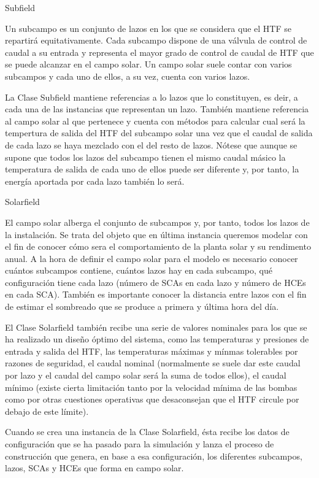 \documentclass[12pt]{report} %
\begin{document}
\hypertarget{subfield}{Subfield}

Un subcampo es un conjunto de lazos en los que se considera que el HTF se repartirá equitativamente. Cada subcampo dispone de una válvula de control de caudal a su entrada y representa el mayor grado de control de caudal de HTF que se puede alcanzar en el campo solar. Un campo solar suele contar con varios subcampos y cada uno de ellos, a su vez, cuenta con varios lazos.  

La Clase Subfield mantiene referencias a lo lazos que lo constituyen, es deir, a cada una de las instancias que representan un lazo. También mantiene referencia al campo solar al que pertenece y cuenta con métodos para calcular cual será la tempertura de salida del HTF del subcampo solar una vez que el caudal de salida de cada lazo se haya mezclado con el del resto de lazos. Nótese que aunque se supone que todos los lazos del subcampo tienen el mismo caudal másico la temperatura de salida de cada uno de ellos puede ser diferente y, por tanto, la energía aportada por cada lazo también lo será. 

\hypertarget{solarfield}{Solarfield}

El campo solar alberga el conjunto de subcampos y, por tanto, todos los lazos de la instalación. Se trata del objeto que en última instancia queremos modelar con el fin de conocer cómo sera el comportamiento de la planta solar y su rendimento anual. A la hora de definir el campo solar para el modelo es necesario conocer cuántos subcampos contiene, cuántos lazos hay en cada subcampo, qué configuración tiene cada lazo (número de SCAs en cada lazo y número de HCEs en cada SCA). También es importante conocer la distancia entre lazos con el fin de estimar el sombreado que se produce a primera y última hora del día. 

El Clase Solarfield también recibe una serie de valores nominales para los que se ha realizado un diseño óptimo del sistema, como las temperaturas y presiones de entrada y salida del HTF, las temperaturas máximas y mínmas tolerables por razones de seguridad, el caudal nominal (normalmente se suele dar este caudal por lazo y el caudal del campo solar será la suma de todos ellos), el caudal mínimo (existe cierta limitación tanto por la velocidad mínima de las bombas como por otras
cuestiones operativas que desaconsejan que el HTF circule por debajo de este límite).

Cuando se crea una instancia de la Clase Solarfield, ésta recibe los datos de configuración que se ha pasado para la simulación y lanza el proceso de construcción que genera, en base a esa configuración, los diferentes subcampos, lazos, SCAs y HCEs que forma en campo solar.
\end{document}
